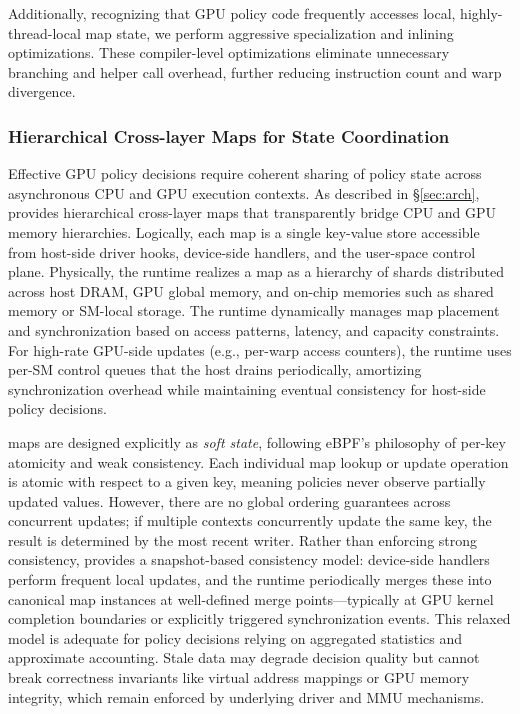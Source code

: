 Additionally, recognizing that GPU policy code frequently accesses local, highly-thread-local map state, we perform aggressive specialization and inlining optimizations. These compiler-level optimizations eliminate unnecessary branching and helper call overhead, further reducing instruction count and warp divergence.

\subsubsection{Hierarchical Cross-layer Maps for State Coordination}

Effective GPU policy decisions require coherent sharing of policy state across asynchronous CPU and GPU execution contexts. As described in \S\ref{sec:arch}, \sys provides hierarchical cross-layer maps that transparently bridge CPU and GPU memory hierarchies. Logically, each map is a single key-value store accessible from host-side driver hooks, device-side handlers, and the user-space control plane. Physically, the runtime realizes a map as a hierarchy of shards distributed across host DRAM, GPU global memory, and on-chip memories such as shared memory or SM-local storage. The runtime dynamically manages map placement and synchronization based on access patterns, latency, and capacity constraints. For high-rate GPU-side updates (e.g., per-warp access counters), the runtime uses per-SM control queues that the host drains periodically, amortizing synchronization overhead while maintaining eventual consistency for host-side policy decisions.

\sys maps are designed explicitly as \emph{soft state}, following eBPF's philosophy of per-key atomicity and weak consistency. Each individual map lookup or update operation is atomic with respect to a given key, meaning policies never observe partially updated values. However, there are no global ordering guarantees across concurrent updates; if multiple contexts concurrently update the same key, the result is determined by the most recent writer. Rather than enforcing strong consistency, \sys provides a snapshot-based consistency model: device-side handlers perform frequent local updates, and the runtime periodically merges these into canonical map instances at well-defined merge points---typically at GPU kernel completion boundaries or explicitly triggered synchronization events. This relaxed model is adequate for policy decisions relying on aggregated statistics and approximate accounting. Stale data may degrade decision quality but cannot break correctness invariants like virtual address mappings or GPU memory integrity, which remain enforced by underlying driver and MMU mechanisms.
